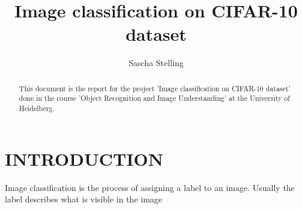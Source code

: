 \documentclass[letterpaper, 10 pt, conference]{ieeeconf}
\author{Sascha Stelling}
\title{Image classification on CIFAR-10 dataset}
\begin{document}
\maketitle
\thispagestyle{empty}
\pagestyle{empty}

\begin{abstract}
	This document is the report for the project 'Image classification on CIFAR-10 dataset' done in the course 'Object Recognition and Image Understanding' at the University of Heidelberg.
\end{abstract}


\section{INTRODUCTION}

Image classification is the process of assigning a label to an image. Usually the label describes what is visible in the image
\end{document}
